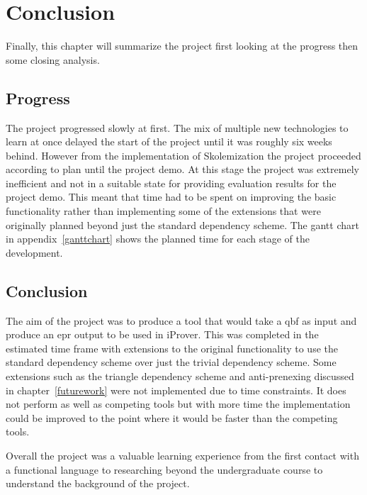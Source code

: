 \chapter{Conclusion}
Finally, this chapter will summarize the project first looking at the progress then some closing analysis.

\section{Progress}
The project progressed slowly at first. The mix of multiple new technologies to learn at once delayed the start of the project until it was roughly six weeks behind. However from the implementation of Skolemization the project proceeded according to plan until the project demo. At this stage the project was extremely inefficient and not in a suitable state for providing evaluation results for the project demo. This meant that time had to be spent on improving the basic functionality rather than implementing some of the extensions that were originally planned beyond just the standard dependency scheme. The gantt chart in appendix~\ref{ganttchart} shows the planned time for each stage of the development.

\section{Conclusion}
The aim of the project was to produce a tool that would take a \gls{qbf} as input and produce an \gls{epr} output to be used in iProver. This was completed in the estimated time frame with extensions to the original functionality to use the standard dependency scheme over just the trivial dependency scheme. Some extensions such as the triangle dependency scheme and anti-prenexing discussed in chapter~\ref{futurework} were not implemented due to time constraints. It does not perform as well as competing tools but with more time the implementation could be improved to the point where it would be faster than the competing tools.

Overall the project was a valuable learning experience from the first contact with a functional language to researching beyond the undergraduate course to understand the background of the project.
